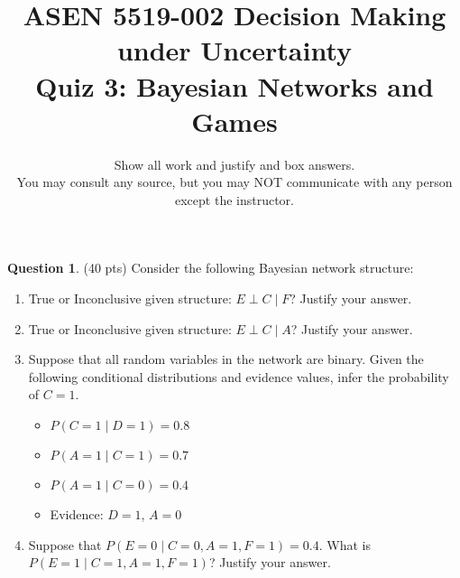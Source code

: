 \documentclass{article}
\title{ASEN 5519-002 Decision Making under Uncertainty\\
       Quiz 3: Bayesian Networks and Games}
\date{\small Show all work and justify and box answers.\\
You may consult any source, but you may NOT communicate with any person except the instructor.
}
\theoremstyle{definition}
\newtheorem{question}[thm]{Question}
\begin{document}
\maketitle

\begin{question} (40 pts)
    Consider the following Bayesian network structure:

    \begin{center}
    \end{center}

    \begin{enumerate}[label=\alph*)]
        \item True or Inconclusive given structure: $E\perp C \mid F$? Justify your answer.
        \item True or Inconclusive given structure: $E\perp C \mid A$? Justify your answer.
        \item Suppose that all random variables in the network are binary. Given the following conditional distributions and evidence values, infer the probability of $C=1$.
            \begin{itemize}
                \item $P(C=1 \mid D=1) = 0.8$
                \item $P(A=1\mid C=1) = 0.7$
                \item $P(A=1\mid C=0) = 0.4$
                \item Evidence: $D=1$, $A=0$
            \end{itemize}
        \item Suppose that $P(E=0 \mid C=0, A=1, F=1) = 0.4$. What is $P(E=1 \mid C=1, A=1, F=1)$? Justify your answer.
    \end{enumerate}
\end{question}
\end{document}
